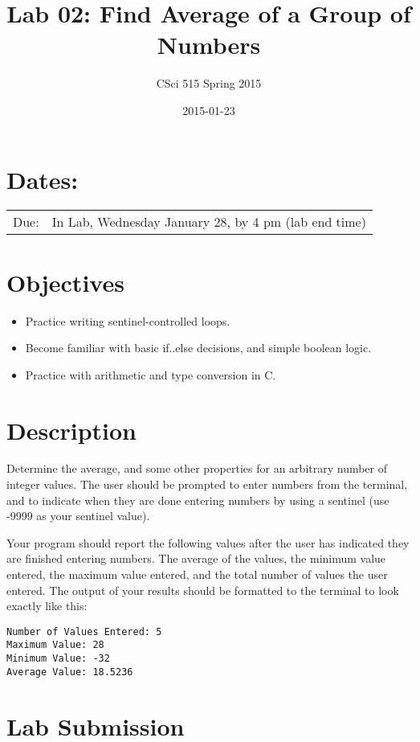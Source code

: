 \documentclass[11pt]{article}
\title{Lab 02: Find Average of a Group of Numbers}
\author{CSci 515 Spring 2015}
\date{2015-01-23}
\begin{document}
\maketitle


\section*{Dates:}
\label{sec-1}


\begin{center}
\begin{tabular}{ll}
 Due:  &  In Lab, Wednesday January 28, by 4 pm (lab end time)  \\
\end{tabular}
\end{center}
\section*{Objectives}
\label{sec-2}

\begin{itemize}
\item Practice writing sentinel-controlled loops.
\item Become familiar with basic if..else decisions, and simple boolean logic.
\item Practice with arithmetic and type conversion in C.
\end{itemize}
\section*{Description}
\label{sec-3}

Determine the average, and some other properties for an arbitrary
number of integer values.  The user should be prompted to enter
numbers from the terminal, and to indicate when they are done entering
numbers by using a sentinel (use -9999 as your sentinel value).

Your program should report the following values after the user has
indicated they are finished entering numbers.  The average of the
values, the minimum value entered, the maximum value entered, and the
total number of values the user entered.  The output of your results
should be formatted to the terminal to look exactly like this:


\begin{verbatim}
Number of Values Entered: 5
Maximum Value: 28
Minimum Value: -32
Average Value: 18.5236
\end{verbatim}
\section*{Lab Submission}
\label{sec-4}
\end{document}
